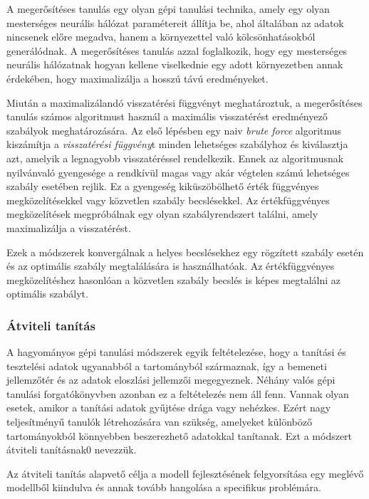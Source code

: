 \documentclass[12pt,a4]{article}
\begin{document}
	A megerősítéses tanulás egy olyan gépi tanulási technika, amely egy olyan
	mesterséges neurális hálózat paramétereit állítja be, ahol általában az adatok nincsenek előre megadva, hanem a környezettel való kölcsönhatásokból generálódnak. A megerősítéses tanulás azzal foglalkozik, hogy egy mesterséges neurális hálózatnak hogyan kellene viselkednie egy adott környezetben annak érdekében, hogy maximalizálja a hosszú távú 
	eredményeket.
	
	Miután a maximalizálandó visszatérési függvényt meghatároztuk, a megerősítéses tanulás számos algoritmust használ a maximális visszatérést eredményező szabályok meghatározására. Az első lépésben egy naiv \textit{brute force} algoritmus kiszámítja a \textit{visszatérési függvény}t minden lehetséges szabályhoz és kiválasztja azt, amelyik a legnagyobb visszatéréssel rendelkezik. Ennek az algoritmusnak nyilvánvaló gyengesége a rendkívül magas vagy akár végtelen számú lehetséges szabály esetében rejlik. Ez a gyengeség kiküszöbölhető érték függvényes megközelítésekkel vagy közvetlen szabály becslésekkel. Az értékfüggvényes megközelítések megpróbálnak
	egy olyan szabályrendszert találni, amely maximalizálja a visszatérést.
	
	Ezek a módszerek konvergálnak a helyes becslésekhez egy rögzített szabály esetén és az optimális szabály megtalálására is használhatóak. Az értékfüggvényes megközelítéshez hasonlóan a közvetlen szabály becslés is képes megtalálni az optimális szabályt.

    \subsubsection{Átviteli tanítás}
    
     \cite{tl}A hagyományos gépi tanulási módszerek egyik feltételezése, hogy a tanítási és tesztelési adatok ugyanabból a tartományból származnak, így a bemeneti jellemzőtér és az adatok eloszlási jellemzői megegyeznek. Néhány valós gépi tanulási forgatókönyvben azonban ez a feltételezés nem áll fenn. Vannak olyan esetek, amikor a tanítási adatok gyűjtése drága vagy nehézkes. Ezért nagy teljesítményű tanulók létrehozására van szükség, amelyeket különböző tartományokból könnyebben beszerezhető adatokkal tanítanak. Ezt a módszert átviteli tanításnak0 nevezzük.

     Az átviteli tanítás alapvető célja a modell fejlesztésének felgyorsítása egy meglévő modellből kiindulva és annak tovább hangolása a specifikus problémára.
 
\end{document}
